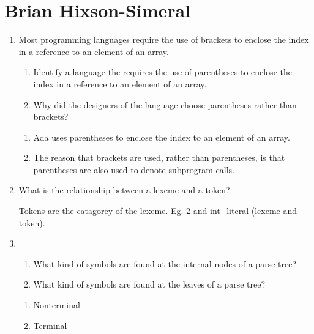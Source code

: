 
\chapter{Brian Hixson-Simeral}

\begin{enumerate}
  \item Most programming languages require the use of brackets to
    enclose the index in a reference to an element of an array.
  \begin{enumerate}
    \item Identify a language the requires the use of parentheses
      to enclose the index in a reference to an element of an array.
    \item Why did the designers of the language choose parentheses
      rather than brackets?
    \end{enumerate}

  \begin{answer}

  \begin{enumerate}
    \item Ada uses parentheses to enclose the index to an element of an array.
    \item The reason that brackets are used, rather than parentheses, is that parentheses are also used to denote subprogram calls.
    \end{enumerate}

    \end{answer}
    
  \item What is the relationship between a lexeme and a token?

  \begin{answer}

    Tokens are the catagorey of the lexeme.  Eg. 2 and int_literal (lexeme and token).

    \end{answer}

  \item
  \begin{enumerate}
    \item What kind of symbols are found at the internal nodes of a
      parse tree?
    \item What kind of symbols are found at the leaves of a parse tree?
    \end{enumerate}

  \begin{answer}

  \begin{enumerate}
    \item Nonterminal
    \item Terminal
    \end{enumerate}


\end{answer}
\end{enumerate}
